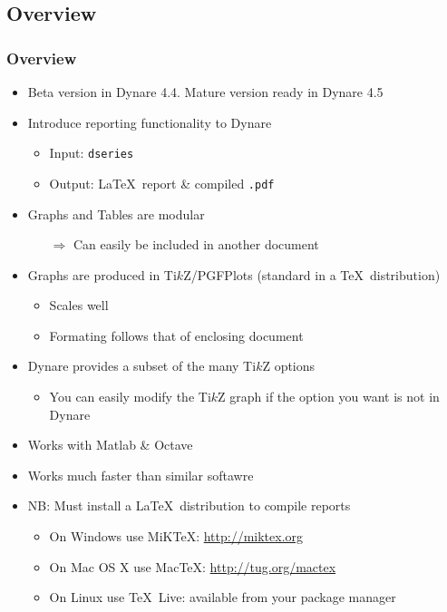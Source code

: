 \documentclass[10pt]{beamer}
\newcommand{\myitem}{\item[$\bullet$]}
\begin{document}
\subsection{Overview}
\begin{frame}[fragile,t]
  \frametitle{Overview}
  \begin{itemize}
  \myitem Beta version in Dynare 4.4. Mature version ready in Dynare 4.5
  \myitem Introduce reporting functionality to Dynare
      \begin{itemize}
      \myitem Input: \texttt{dseries}
      \myitem Output: \LaTeX\ report \& compiled \texttt{.pdf}
      \end{itemize}
    \myitem Graphs and Tables are modular
      \begin{itemize}
      \item[$\Rightarrow$] Can easily be included in another document
      \end{itemize}
    \myitem Graphs are produced in Ti$k$Z/PGFPlots (standard in a \TeX\ distribution)
      \begin{itemize}
      \myitem Scales well
      \myitem Formating follows that of enclosing document
      \end{itemize}
    \myitem Dynare provides a subset of the many Ti$k$Z options
      \begin{itemize}
      \myitem You can easily modify the Ti$k$Z graph if the option you want is not in Dynare
      \end{itemize}
    \myitem Works with Matlab \& Octave
    \myitem Works much faster than similar softawre
    \myitem NB: Must install a \LaTeX\ distribution to compile reports
      \begin{itemize}
      \myitem On Windows use MiKTeX: \url{http://miktex.org}
      \myitem On Mac OS X use MacTeX: \url{http://tug.org/mactex}
      \myitem On Linux use \TeX\ Live: available from your package manager
      \end{itemize}
  \end{itemize}
\end{frame}
\end{document}
